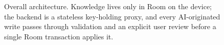 \begin{figure}[H]
{%
}
\caption{Overall architecture. Knowledge lives only in Room on the device; the backend is a
stateless key-holding proxy, and every AI-originated write passes through validation and an
explicit user review before a single Room transaction applies it.}
\label{fig:architecture}
\end{figure}
